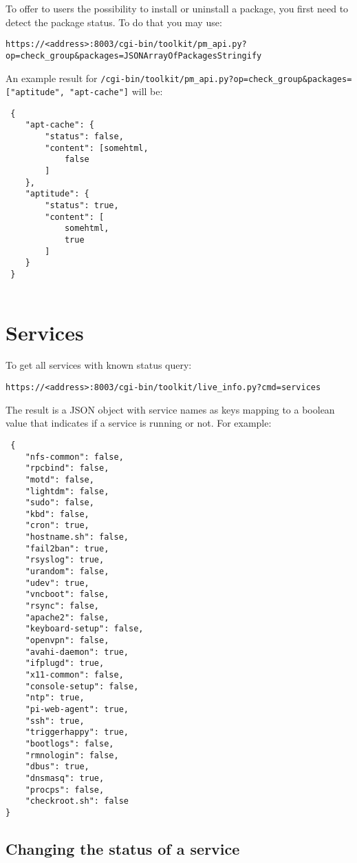 \documentclass[12pt]{article}
\begin{document}
 To offer to users the possibility to install or uninstall a package, you first need to detect the package status. To do that you may use:
 
 \texttt{https://<address>:8003/cgi-bin/toolkit/pm_api.py?op=check\_group\&packages=JSONArrayOfPackagesStringify}
 

 An example result for \texttt{/cgi-bin/toolkit/pm\_api.py?op=check\_group\&packages=["aptitude", "apt-cache"]} will be:
 
 \begin{verbatim}
 {
    "apt-cache": {
        "status": false,
        "content": [somehtml,
            false
        ]
    },
    "aptitude": {
        "status": true,
        "content": [
            somehtml,
            true
        ]
    }
 }
 
\end{verbatim}
 
 
 \section{Services}
 To get all services with known status query:
 
 
 \texttt{https://<address>:8003/cgi-bin/toolkit/live\_info.py?cmd=services}
 
 The result is a JSON object with service names as keys mapping to a boolean value that indicates if a service is running or not. For example:
 
 \begin{verbatim}
 {
    "nfs-common": false,
    "rpcbind": false,
    "motd": false,
    "lightdm": false,
    "sudo": false,
    "kbd": false,
    "cron": true,
    "hostname.sh": false,
    "fail2ban": true,
    "rsyslog": true,
    "urandom": false,
    "udev": true,
    "vncboot": false,
    "rsync": false,
    "apache2": false,
    "keyboard-setup": false,
    "openvpn": false,
    "avahi-daemon": true,
    "ifplugd": true,
    "x11-common": false,
    "console-setup": false,
    "ntp": true,
    "pi-web-agent": true,
    "ssh": true,
    "triggerhappy": true,
    "bootlogs": false,
    "rmnologin": false,
    "dbus": true,
    "dnsmasq": true,
    "procps": false,
    "checkroot.sh": false
}
 \end{verbatim}
 
 \subsection{Changing the status of a service}
 
\end{document}
